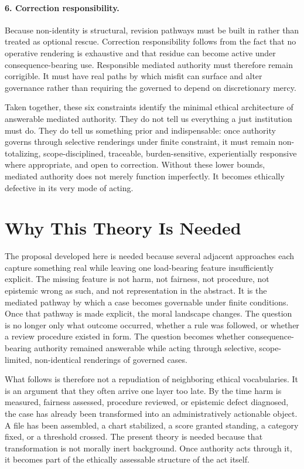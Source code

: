 \documentclass[11pt]{article}
\begin{document}
\paragraph{6. Correction responsibility.}
Because non-identity is structural, revision pathways must be built in rather than treated as optional rescue. Correction responsibility follows from the fact that no operative rendering is exhaustive and that residue can become active under consequence-bearing use. Responsible mediated authority must therefore remain corrigible. It must have real paths by which misfit can surface and alter governance rather than requiring the governed to depend on discretionary mercy.

Taken together, these six constraints identify the minimal ethical architecture of answerable mediated authority. They do not tell us everything a just institution must do. They do tell us something prior and indispensable: once authority governs through selective renderings under finite constraint, it must remain non-totalizing, scope-disciplined, traceable, burden-sensitive, experientially responsive where appropriate, and open to correction. Without these lower bounds, mediated authority does not merely function imperfectly. It becomes ethically defective in its very mode of acting.
\section{Why This Theory Is Needed}

The proposal developed here is needed because several adjacent approaches each capture something real while leaving one load-bearing feature insufficiently explicit. The missing feature is not harm, not fairness, not procedure, not epistemic wrong as such, and not representation in the abstract. It is the mediated pathway by which a case becomes governable under finite conditions. Once that pathway is made explicit, the moral landscape changes. The question is no longer only what outcome occurred, whether a rule was followed, or whether a review procedure existed in form. The question becomes whether consequence-bearing authority remained answerable while acting through selective, scope-limited, non-identical renderings of governed cases. \cite{BowkerStar1999SortingThingsOut,Fricker2007EpistemicInjustice,MoynihanHerdHarvey2015AdministrativeBurden,LepriEtAl2018FairTransparentAccountableADM,Tabassi2023NISTAIRMF,Swanson2026MediatedJudgmentConstraint}

What follows is therefore not a repudiation of neighboring ethical vocabularies. It is an argument that they often arrive one layer too late. By the time harm is measured, fairness assessed, procedure reviewed, or epistemic defect diagnosed, the case has already been transformed into an administratively actionable object. A file has been assembled, a chart stabilized, a score granted standing, a category fixed, or a threshold crossed. The present theory is needed because that transformation is not morally inert background. Once authority acts through it, it becomes part of the ethically assessable structure of the act itself.
\end{document}
